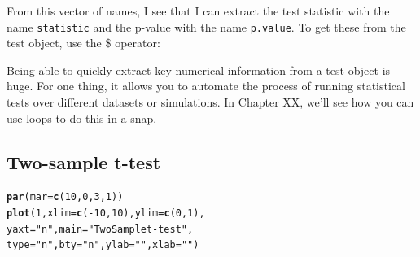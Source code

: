 \documentclass{tufte-book}\usepackage[]{graphicx}\usepackage[]{color}
\makeatletter
\newcommand{\hlnum}[1]{\textcolor[rgb]{0.686,0.059,0.569}{#1}}%
\newcommand{\hlstr}[1]{\textcolor[rgb]{0.192,0.494,0.8}{#1}}%
\newcommand{\hlcom}[1]{\textcolor[rgb]{0.678,0.584,0.686}{\textit{#1}}}%
\newcommand{\hlopt}[1]{\textcolor[rgb]{0,0,0}{#1}}%
\newcommand{\hlstd}[1]{\textcolor[rgb]{0.345,0.345,0.345}{#1}}%
\newcommand{\hlkwc}[1]{\textcolor[rgb]{0.333,0.667,0.333}{#1}}%
\newcommand{\hlkwd}[1]{\textcolor[rgb]{0.737,0.353,0.396}{\textbf{#1}}}%
\newenvironment{kframe}{%
 \def\at@end@of@kframe{}%
 \ifinner\ifhmode%
  \def\at@end@of@kframe{\end{minipage}}%
  \begin{minipage}{\columnwidth}%
 \fi\fi%
 \def\FrameCommand##1{\hskip\@totalleftmargin \hskip-\fboxsep
 \colorbox{shadecolor}{##1}\hskip-\fboxsep
     \hskip-\linewidth \hskip-\@totalleftmargin \hskip\columnwidth}%
 \MakeFramed {\advance\hsize-\width
   \@totalleftmargin\z@ \linewidth\hsize
   \@setminipage}}%
 {\par\unskip\endMakeFramed%
 \at@end@of@kframe}
\newenvironment{knitrout}{}{} %
\makeatother
\begin{document}
\begin{footnotesize}
From this vector of names, I see that I can extract the test statistic with the name \texttt{statistic} and the p-value with the name \texttt{p.value}. To get these from the test object, use the \$ operator:


Being able to quickly extract key numerical information from a test object is huge. For one thing, it allows you to automate the process of running statistical tests over different datasets or simulations. In Chapter XX, we'll see how you can use loops to do this in a snap.

\subsection{Two-sample t-test}

\begin{marginfigure}
\begin{tiny}
\begin{knitrout}
\color{fgcolor}\begin{kframe}
\begin{alltt}
\hlkwd{par}\hlstd{(}\hlkwc{mar} \hlstd{=} \hlkwd{c}\hlstd{(}\hlnum{10}\hlstd{,} \hlnum{0}\hlstd{,} \hlnum{3}\hlstd{,} \hlnum{1}\hlstd{))}
\hlkwd{plot}\hlstd{(}\hlnum{1}\hlstd{,} \hlkwc{xlim} \hlstd{=} \hlkwd{c}\hlstd{(}\hlopt{-}\hlnum{10}\hlstd{,} \hlnum{10}\hlstd{),} \hlkwc{ylim} \hlstd{=} \hlkwd{c}\hlstd{(}\hlnum{0}\hlstd{,} \hlnum{1}\hlstd{),}
     \hlkwc{yaxt} \hlstd{=} \hlstr{"n"}\hlstd{,} \hlkwc{main} \hlstd{=} \hlstr{"Two Sample t-test"}\hlstd{,}
     \hlkwc{type} \hlstd{=} \hlstr{"n"}\hlstd{,} \hlkwc{bty} \hlstd{=} \hlstr{"n"}\hlstd{,} \hlkwc{ylab} \hlstd{=} \hlstr{""}\hlstd{,} \hlkwc{xlab} \hlstd{=} \hlstr{""}\hlstd{)}


\end{alltt}
\end{kframe}
\end{knitrout}
\end{tiny}
\end{marginfigure}
\end{footnotesize}
\end{document}
